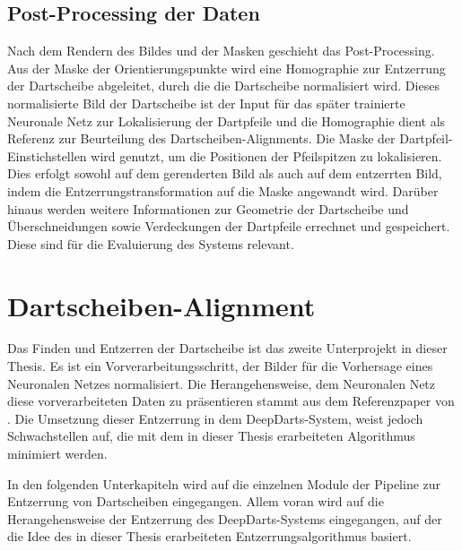 
\subsection{Post-Processing der Daten}
\label{sec:impl:daten:postprocess}

Nach dem Rendern des Bildes und der Masken geschieht das Post-Processing. Aus der Maske der Orientierungspunkte wird eine Homographie zur Entzerrung der Dartscheibe abgeleitet, durch die die Dartscheibe normalisiert wird. Dieses normalisierte Bild der Dartscheibe ist der Input für das später trainierte Neuronale Netz zur Lokalisierung der Dartpfeile und die Homographie dient als Referenz zur Beurteilung des Dartscheiben-Alignments. Die Maske der Dartpfeil-Einstichstellen wird genutzt, um die Positionen der Pfeilspitzen zu lokalisieren. Dies erfolgt sowohl auf dem gerenderten Bild als auch auf dem entzerrten Bild, indem die Entzerrungstransformation auf die Maske angewandt wird. Darüber hinaus werden weitere Informationen zur Geometrie der Dartscheibe und Überschneidungen sowie Verdeckungen der Dartpfeile errechnet und gespeichert. Diese sind für die Evaluierung des Systems relevant.


\section{Dartscheiben-Alignment}
\label{sec:impl:cv}

Das Finden und Entzerren der Dartscheibe ist das zweite Unterprojekt in dieser Thesis. Es ist ein Vorverarbeitungsschritt, der Bilder für die Vorhersage eines Neuronalen Netzes normalisiert. Die Herangehensweise, dem Neuronalen Netz diese vorverarbeiteten Daten zu präsentieren stammt aus dem Referenzpaper von \citeauthor{deepdarts} \cite{deepdarts}. Die Umsetzung dieser Entzerrung in dem DeepDarts-System, weist jedoch Schwachstellen auf, die mit dem in dieser Thesis erarbeiteten Algorithmus minimiert werden.

In den folgenden Unterkapiteln wird auf die einzelnen Module der Pipeline zur Entzerrung von Dartscheiben eingegangen. Allem voran wird auf die Herangehensweise der Entzerrung des DeepDarts-Systems eingegangen, auf der die Idee des in dieser Thesis erarbeiteten Entzerrungsalgorithmus basiert.

